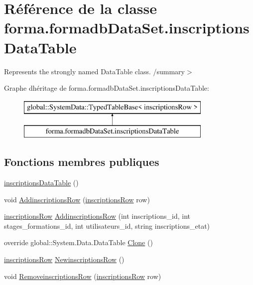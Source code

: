 \hypertarget{classforma_1_1formadb_data_set_1_1inscriptions_data_table}{}\section{Référence de la classe forma.\+formadb\+Data\+Set.\+inscriptions\+Data\+Table}
\label{classforma_1_1formadb_data_set_1_1inscriptions_data_table}


Represents the strongly named Data\+Table class. /summary$>$  


Graphe d\textquotesingle{}héritage de forma.\+formadb\+Data\+Set.\+inscriptions\+Data\+Table\+:\begin{figure}[H]
\begin{center}
\leavevmode
\includegraphics[height=2.000000cm]{classforma_1_1formadb_data_set_1_1inscriptions_data_table}
\end{center}
\end{figure}
\subsection*{Fonctions membres publiques}
\begin{DoxyCompactItemize}
\item 
\hyperlink{classforma_1_1formadb_data_set_1_1inscriptions_data_table_a77514785aa490aa2b59c79c1333c8f14}{inscriptions\+Data\+Table} ()
\item 
void \hyperlink{classforma_1_1formadb_data_set_1_1inscriptions_data_table_ac17e97131c2369b5a9157de9215e1f08}{Addinscriptions\+Row} (\hyperlink{classforma_1_1formadb_data_set_1_1inscriptions_row}{inscriptions\+Row} row)
\item 
\hyperlink{classforma_1_1formadb_data_set_1_1inscriptions_row}{inscriptions\+Row} \hyperlink{classforma_1_1formadb_data_set_1_1inscriptions_data_table_a26fe5153d5abe3d69c98450b979a58b4}{Addinscriptions\+Row} (int inscriptions\+\_\+id, int stages\+\_\+formations\+\_\+id, int utilisateurs\+\_\+id, string inscriptions\+\_\+etat)
\item 
override global\+::\+System.\+Data.\+Data\+Table \hyperlink{classforma_1_1formadb_data_set_1_1inscriptions_data_table_ab0554d6e7226ba2e014de82ca678f55e}{Clone} ()
\item 
\hyperlink{classforma_1_1formadb_data_set_1_1inscriptions_row}{inscriptions\+Row} \hyperlink{classforma_1_1formadb_data_set_1_1inscriptions_data_table_a37dc27df7d5133fa850b717a741568af}{Newinscriptions\+Row} ()
\item 
void \hyperlink{classforma_1_1formadb_data_set_1_1inscriptions_data_table_ae18a4ce295cdf05587b0a842fc10cb93}{Removeinscriptions\+Row} (\hyperlink{classforma_1_1formadb_data_set_1_1inscriptions_row}{inscriptions\+Row} row)
\end{DoxyCompactItemize}

